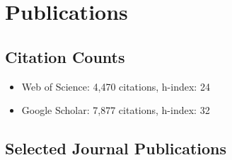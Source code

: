 \documentclass[10pt, a4paper]{article}
\begin{document}
\section*{Publications}

\subsection*{Citation Counts}
\begin{itemize}
\item Web of Science: 4,470 citations, h-index: 24
\item Google Scholar: 7,877 citations, h-index: 32 
\end{itemize}
\subsection*{Selected Journal Publications}
\label{sec:org97ece48}
\end{document}
